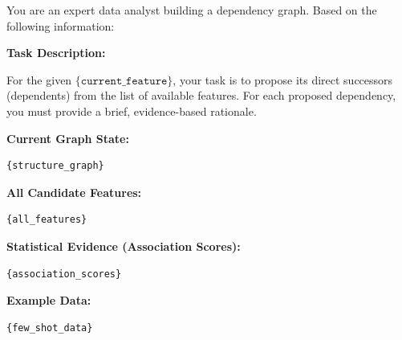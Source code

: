 \begin{tcolorbox}[
    float*=t, width=\textwidth, floatplacement=htbp,
    colback=pink!10!white,  %
    colframe=pink!75!black, %
    title={Prompt for Link Generation in Dependency Discovery ($\pi_\mathtt{generate}$)}, %
    fonttitle=\bfseries\color{white}, 
    arc=2mm, %
    boxrule=1pt %
]
\small %

You are an expert data analyst building a dependency graph. Based on the following information:

\vspace{\medskipamount} %

\textbf{Task Description:}

For the given $\texttt{\{current\_feature}\}$, your task is to propose its direct successors (dependents) 
from the list of available features. For each proposed dependency, you must provide a 
brief, evidence-based rationale.

\vspace{\medskipamount} %

\textbf{Current Graph State:}
\begin{verbatim}
{structure_graph}
\end{verbatim}
\vspace{\medskipamount} %

\textbf{All Candidate Features:}
\begin{verbatim}
{all_features}
\end{verbatim}
\vspace{\medskipamount} %

\textbf{Statistical Evidence (Association Scores):}
\begin{verbatim}
{association_scores}
\end{verbatim}
\vspace{\medskipamount} %

\textbf{Example Data:}
\begin{verbatim}
{few_shot_data}
\end{verbatim}
\vspace{\medskipamount} %


\end{tcolorbox}
